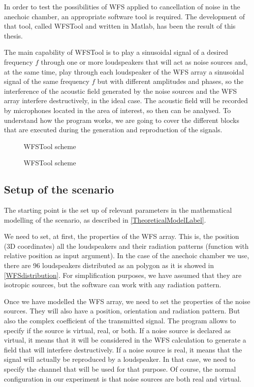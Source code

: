 In order to test the possibilities of WFS applied to cancellation of noise in the anechoic chamber, an appropriate software tool is required. The development of that tool, called WFSTool and written in Matlab, has been the result of this thesis.

The main capability of WFSTool is to play a sinusoidal signal of a desired frequency $f$ through one or more loudspeakers that will act as noise sources and, at the same time, play through each loudspeaker of the WFS array a sinusoidal signal of the same frequency $f$ but with different amplitudes and phases, so the interference of the acoustic field generated by the noise sources and the WFS array interfere destructively, in the ideal case. The acoustic field will be recorded by microphones located in the area of interest, so then can be analysed. To understand how the program works, we are going to cover the different blocks that are executed during the generation and reproduction of the signals.

\begin{figure}
	\centering
	\def\svgwidth{1\columnwidth}
	\graphicspath{{Img/}}
	
	\caption{WFSTool scheme}
	\label{figprueba}
\end{figure}

\begin{figure}
	\centering
	\def\svgwidth{1\columnwidth}
	\graphicspath{{Img/}}
	
	\caption{WFSTool scheme}
	\label{figWFSToolScheme}
\end{figure}

\subsection{Setup of the scenario}
The starting point is the set up of relevant parameters in the mathematical modelling of the scenario, as described in \autoref{TheoreticalModelLabel}.

We need to set, at first, the properties of the WFS array. This is, the position (3D coordinates) all the loudspeakers and their radiation patterns (function with relative position as input argument). In the case of the anechoic chamber we use, there are 96 loudspeakers distributed as an polygon as it is showed in \autoref{WFSdistribution}. For simplification purposes, we have assumed that they are isotropic sources, but the software can work with any radiation pattern.

Once we have modelled the WFS array, we need to set the properties of the noise sources. They will also have a position, orientation and radiation pattern. But also the complex coefficient of the transmitted signal. The program allows to specify if the source is virtual, real, or both. If a noise source is declared as virtual, it means that it will be considered in the WFS calculation to generate a field that will interfere destructively. If a noise source is real, it means that the signal will actually be reproduced by a loudspeaker. In that case, we need to specify the channel that will be used for that purpose. Of course, the normal configuration in our experiment is that noise sources are both real and virtual.

